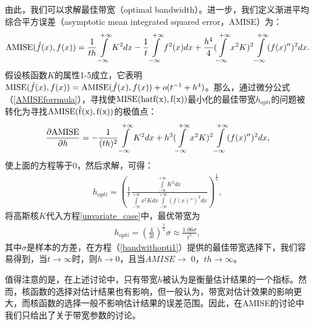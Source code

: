 由此，我们可以求解最佳带宽（optimal bandwidth）。进一步，我们定义渐进平均综合平方误差（asymptotic mean integrated squared error，AMISE）为：
\begin{align}\label{AMISEforrmula}
{\rm AMISE}(\hat{f}(x), f(x)) = \frac{1}{th}\int\limits_{-\infty}^{+\infty}K^2dx-\frac{1}{t}\int\limits_{-\infty}^{+\infty}f^{2}(x)dx + \frac{h^{4}}{4}(\int\limits_{-\infty}^{+\infty}x^{2}K)^{2}\int\limits_{-\infty}^{+\infty}(f(x)'')^{2}dx.
\end{align}
假设核函数$K$的属性1-5成立，它表明$ {\rm MISE}(\hat{f}(x), f(x)) = {\rm AMISE}(\hat{f}(x), f(x)) + o(t^{-1}+h^{4})$。那么，通过微分公式（\ref{AMISEforrmula}），寻找使$\rm{MISE}(hat{f}(x), f(x))$最小化的最佳带宽$h_{opti}$的问题被转化为寻找$\rm{AMISE}(\hat{f}(x), f(x))$的极值点：
\begin{align}\label{AMISEforrmula1}
 \frac{\partial {\rm AMISE}}{\partial h}= -\frac{1}{(th)^{2}}\int\limits_{-\infty}^{+\infty}K^2dx+ h^{3}(\int\limits_{-\infty}^{+\infty}x^{2}K)^{2}\int\limits_{-\infty}^{+\infty}(f(x)'')^{2}dx,
\end{align}
使上面的方程等于0，然后求解，可得：
\begin{align}\label{unvariate_case}
h_{opti} = \left(\frac{1}{t}\frac{\int\limits_{-\infty}^{+\infty}K^2dx}{\int\limits_{-\infty}^{+\infty}x^2Kdx \int\limits_{-\infty}^{+\infty}(f(x)'')^{2}dx}\right)^{\frac{1}{5}},
\end{align}
将高斯核$K$代入方程\ref{unvariate_case}中，最优带宽为
\begin{align}\label{bandwithopti1}
h_{opti} = \left(\frac{4}{3t}\right)^{\frac{1}{5}}\sigma \approx\frac{1.06\sigma}{t^{5}},
\end{align}
其中$\sigma$是样本的方差，在方程（\ref{bandwithopti1}）提供的最佳带宽选择下，我们容易得到，当$t\rightarrow\infty$时，则$h\rightarrow 0$，且当$AMISE \rightarrow$ 0，$th\rightarrow \infty$。

值得注意的是，在上述讨论中，只有带宽$h$被认为是衡量估计结果的一个指标。然而，核函数的选择对估计结果也有影响，但一般认为，带宽对估计效果的影响更大，而核函数的选择一般不影响估计结果的误差范围。因此，在AMISE的讨论中我们只给出了关于带宽参数的讨论。

